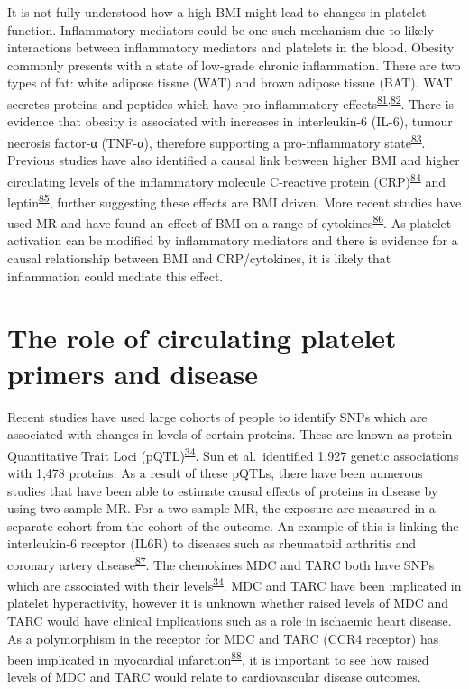 \documentclass[11pt,twoside]{bristolthesis}
\begin{document}
It is not fully understood how a high BMI might lead to changes in platelet function. Inflammatory mediators could be one such mechanism due to likely interactions between inflammatory mediators and platelets in the blood. Obesity commonly presents with a state of low-grade chronic inflammation. There are two types of fat: white adipose tissue (WAT) and brown adipose tissue (BAT). WAT secretes proteins and peptides which have pro-inflammatory effects\textsuperscript{\protect\hyperlink{ref-Cercato2019}{81},\protect\hyperlink{ref-Kern2001}{82}}. There is evidence that obesity is associated with increases in interleukin-6 (IL-6), tumour necrosis factor-α (TNF-α), therefore supporting a pro-inflammatory state\textsuperscript{\protect\hyperlink{ref-Esser2014}{83}}. Previous studies have also identified a causal link between higher BMI and higher circulating levels of the inflammatory molecule C-reactive protein (CRP)\textsuperscript{\protect\hyperlink{ref-Timpson2011}{84}} and leptin\textsuperscript{\protect\hyperlink{ref-Zaghlool2021}{85}}, further suggesting these effects are BMI driven. More recent studies have used MR and have found an effect of BMI on a range of cytokines\textsuperscript{\protect\hyperlink{ref-Kalaoja2021}{86}}. As platelet activation can be modified by inflammatory mediators and there is evidence for a causal relationship between BMI and CRP/cytokines, it is likely that inflammation could mediate this effect.

\hypertarget{the-role-of-circulating-platelet-primers-and-disease}{%
\section{The role of circulating platelet primers and disease}\label{the-role-of-circulating-platelet-primers-and-disease}}

Recent studies have used large cohorts of people to identify SNPs which are associated with changes in levels of certain proteins. These are known as protein Quantitative Trait Loci (pQTL)\textsuperscript{\protect\hyperlink{ref-Sun2018}{34}}. Sun et al.~identified 1,927 genetic associations with 1,478 proteins. As a result of these pQTLs, there have been numerous studies that have been able to estimate causal effects of proteins in disease by using two sample MR. For a two sample MR, the exposure are measured in a separate cohort from the cohort of the outcome. An example of this is linking the interleukin-6 receptor (IL6R) to diseases such as rheumatoid arthritis and coronary artery disease\textsuperscript{\protect\hyperlink{ref-Bretherick2020}{87}}. The chemokines MDC and TARC both have SNPs which are associated with their levels\textsuperscript{\protect\hyperlink{ref-Sun2018}{34}}. MDC and TARC have been implicated in platelet hyperactivity, however it is unknown whether raised levels of MDC and TARC would have clinical implications such as a role in ischaemic heart disease. As a polymorphism in the receptor for MDC and TARC (CCR4 receptor) has been implicated in myocardial infarction\textsuperscript{\protect\hyperlink{ref-Noori2018}{88}}, it is important to see how raised levels of MDC and TARC would relate to cardiovascular disease outcomes.
\end{document}
